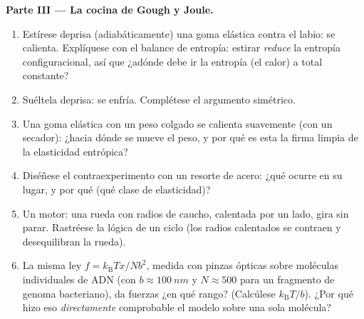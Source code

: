 \begin{problem}
\medskip\noindent\textbf{Parte III --- La cocina de Gough y Joule.}
\begin{enumerate}[resume]
  \item Estírese deprisa (adiabáticamente) una goma elástica contra el
        labio: se calienta. Explíquese con el balance de entropía: estirar
        \emph{reduce} la entropía configuracional, así que ¿adónde debe ir
        la entropía (el calor) a total constante?
  \item Suéltela deprisa: se enfría. Complétese el argumento simétrico.
  \item Una goma elástica con un peso colgado se calienta suavemente (con
        un secador): ¿hacia dónde se mueve el peso, y por qué es esta la
        firma limpia de la elasticidad entrópica?
  \item Diséñese el contraexperimento con un resorte de acero: ¿qué ocurre
        en su lugar, y por qué (qué clase de elasticidad)?
  \item Un motor: una rueda con radios de caucho, calentada por un lado,
        gira sin parar. Rastréese la lógica de un ciclo (los radios
        calentados se contraen y desequilibran la rueda).
  \item La misma ley $f = k_{\text{B}}Tx/Nb^2$, medida con pinzas ópticas
        sobre moléculas individuales de ADN (con $b \approx
        \qty{100}{nm}$ y $N \approx 500$ para un fragmento de genoma
        bacteriano), da fuerzas ¿en qué rango? (Calcúlese
        $k_{\text{B}}T/b$). ¿Por qué hizo eso \emph{directamente}
        comprobable el modelo sobre una sola molécula?
\end{enumerate}


\end{problem}
